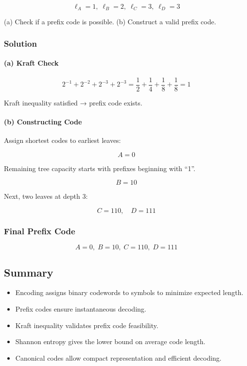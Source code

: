 \documentclass{AnantDocumentation}
\begin{document}
\[
\ell_A = 1,\; \ell_B = 2,\; \ell_C = 3,\; \ell_D = 3
\]

(a) Check if a prefix code is possible.  
(b) Construct a valid prefix code.

\subsubsection*{Solution}

\paragraph{(a) Kraft Check}

\[
2^{-1} + 2^{-2} + 2^{-3} + 2^{-3}
= \frac{1}{2} + \frac{1}{4} + \frac{1}{8} + \frac{1}{8}
= 1
\]

Kraft inequality satisfied → prefix code exists.

\paragraph{(b) Constructing Code}

Assign shortest codes to earliest leaves:

\[
A = 0
\]

Remaining tree capacity starts with prefixes beginning with “1”.

\[
B = 10
\]

Next, two leaves at depth 3:

\[
C = 110,\quad D = 111
\]

\subsubsection*{Final Prefix Code}

\[
\boxed{A=0,\; B=10,\; C=110,\; D=111}
\]

\subsection{Summary}

\begin{itemize}
\item Encoding assigns binary codewords to symbols to minimize expected length.
\item Prefix codes ensure instantaneous decoding.
\item Kraft inequality validates prefix code feasibility.
\item Shannon entropy gives the lower bound on average code length.
\item Canonical codes allow compact representation and efficient decoding.
\end{itemize}
\end{document}

